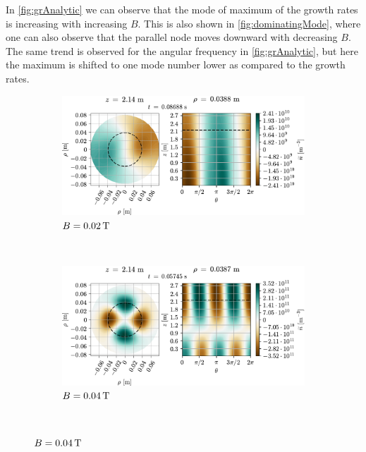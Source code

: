 In \cref{fig:grAnalytic} we can observe that the mode of maximum of the growth rates is increasing with increasing $B$.
This is also shown in \cref{fig:dominatingMode}, where one can also observe that the parallel node moves downward with decreasing $B$.
The same trend is observed for the angular frequency in \cref{fig:grAnalytic}, but here the maximum is shifted to one mode number lower as compared to the growth rates.
%
{
\begin{figure}[htbp]
    \vspace*{-1cm}
    \centering
    \begin{subfigure}[h]{1.00\textwidth}
        \centering
        \includegraphics{fig/results/modesDiffScanVals/B002}
        \caption{$B=0.02 \, \text{T}$}
        \label{fig:B002}
    \end{subfigure}%
    \\
    \begin{subfigure}[h]{1.00\textwidth}
        \centering
        \includegraphics{fig/results/modesDiffScanVals/B004}
        \caption{$B=0.04 \, \text{T}$}
        \label{fig:B004}
    \end{subfigure}
    \\

\end{figure}}
